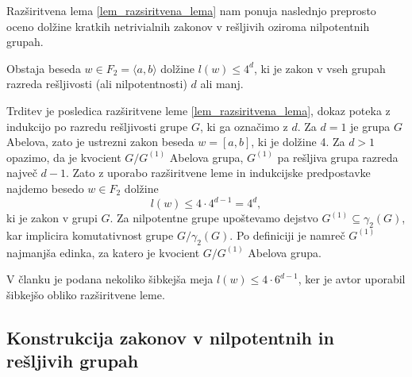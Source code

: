     Razširitvena lema \ref{lem_razsiritvena_lema} nam ponuja naslednjo preprosto oceno dolžine kratkih netrivialnih zakonov v rešljivih oziroma nilpotentnih grupah.

    \begin{trditev}
    \label{trd_ocitna_meja_za_kratke_zakone_resljive_grupe}
     Obstaja beseda $w \in F_2 = \langle a,  b \rangle$ dolžine $l(w) \le 4^{d}$, ki je zakon v vseh grupah razreda rešljivosti (ali nilpotentnosti) $d$ ali manj.  
    \end{trditev}
    \begin{dokaz}
        Trditev je posledica razširitvene leme \ref{lem_razsiritvena_lema}, dokaz poteka z indukcijo po razredu rešljivosti grupe $G$, ki ga označimo z $d$. Za $d = 1$ je grupa $G$ Abelova, zato je ustrezni zakon beseda $w = [a, b]$, ki je dolžine 4.
        Za $d > 1$ opazimo, da je kvocient $G / G^{(1)}$ Abelova grupa, $G^{(1)}$ pa rešljiva grupa razreda največ $d - 1$. Zato z uporabo razširitvene leme in indukcijske predpostavke najdemo besedo $w \in  F_2$ dolžine \begin{equation*}
            l(w) \le  4 \cdot 4^{d - 1} = 4^{d},
        \end{equation*}  
        ki je zakon v grupi $G$. Za nilpotentne grupe upoštevamo dejstvo $G^{(1)} \subseteq \gamma_2(G)$, kar implicira komutativnost grupe $G / \gamma_2(G)$. Po definiciji je namreč $G^{(1)}$ najmanjša edinka, za katero je kvocient $G / G^{(1)}$ Abelova grupa. 
    \end{dokaz}
    
    \begin{opomba}
    V članku \cite[str.~8]{Kozma_Thom_2016} je podana nekoliko šibkejša meja $l(w) \le  4 \cdot 6^{d-1}$, ker je avtor uporabil šibkejšo obliko razširitvene leme.
    \end{opomba}

\subsection{Konstrukcija zakonov v nilpotentnih in rešljivih grupah}

